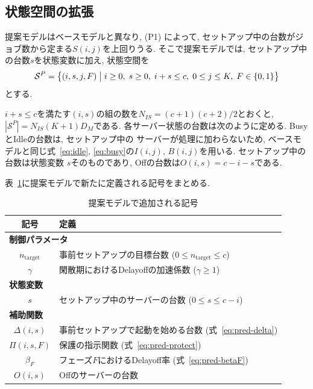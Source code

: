 \documentclass[a4paper, 11pt, dvipdfmx]{jsreport}
\begin{document}
\subsection{状態空間の拡張}
\label{sec:pred-state-space}
 
提案モデルはベースモデルと異なり, (P1) によって, セットアップ中の台数がジョブ数から定まる$S(i, j)$を上回りうる. 
そこで提案モデルでは, セットアップ中の台数$s$を状態変数に加え, 
状態空間を
\begin{equation}
    \mathcal{S}^{P} = \bigl\{ (i, s, j, F) \bigm|
        i \ge 0, \; s \ge 0, \; i + s \le c, \;
        0 \le j \le K, \; F \in \{0, 1\} \bigr\}
    \label{eq:pred-state-space}
\end{equation}
とする. 

 $i+s \le c$を満たす$(i, s)$の組の数を$N_{IS} = (c+1)(c+2)/2$とおくと, 
$|\mathcal{S}^{P}| = N_{IS}(K+1)D_M$である. 
各サーバー状態の台数は次のように定める. BusyとIdleの台数は, セットアップ中の
サーバーが処理に加わらないため, ベースモデルと同じ式~\eqref{eq:idle}, 
\eqref{eq:busy}の$I(i, j)$, $B(i, j)$を用いる. セットアップ中の台数は状態変数
$s$そのものであり, Offの台数は$O(i, s) = c - i - s$である. 
 
 
表~\ref{tab:pred-parameters}に提案モデルで新たに定義される記号をまとめる. 
 
\begin{table}[H]
\centering
\caption{提案モデルで追加される記号}
\label{tab:pred-parameters}
\begin{tabular}{cl}
\hline
記号 & 定義 \\
\hline
\multicolumn{2}{l}{\textbf{制御パラメータ}} \\
$n_{\mathrm{target}}$ & 事前セットアップの目標台数 ($0 \le n_{\mathrm{target}} \le c$) \\
$\gamma$ & 閑散期におけるDelayoffの加速係数 ($\gamma \ge 1$) \\
\multicolumn{2}{l}{\textbf{状態変数}} \\
$s$ & セットアップ中のサーバーの台数 ($0 \le s \le c - i$) \\
\multicolumn{2}{l}{\textbf{補助関数}} \\
$\Delta(i, s)$ & 事前セットアップで起動を始める台数 (式~\eqref{eq:pred-delta}) \\
$\Pi(i, s, F)$ & 保護の指示関数 (式~\eqref{eq:pred-protect}) \\
$\beta_F$ & フェーズ$F$におけるDelayoff率 (式~\eqref{eq:pred-betaF}) \\
$O(i, s)$ & Offのサーバーの台数\\
\hline
\end{tabular}
\end{table}
\end{document}
